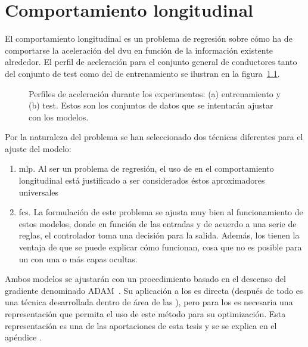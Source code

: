 \chapter{Comportamiento longitudinal}
\label{ch:longitudinal-model}

El comportamiento longitudinal es un problema de regresión sobre cómo ha de comportarse la aceleración del \ac{dvu} en función de la información existente alrededor. El perfil de aceleración para el conjunto general de conductores tanto del conjunto de test como del de entrenamiento se ilustran en la figura~\ref{fig:acceleration-profiles}.

\begin{figure}[!b]
	\centering
	\qquad
	\caption[Perfiles de aceleración a ajustar por los modelos. Conjuntos de entrenamiento y de test]{Perfiles de aceleración durante los experimentos: (a) entrenamiento y (b) test. Estos son los conjuntos de datos que se intentarán ajustar con los modelos.}
	\label{fig:acceleration-profiles}
\end{figure}

Por la naturaleza del problema se han seleccionado dos técnicas diferentes para el ajuste del modelo:

\begin{enumerate}
	\item \ac{mlp}. Al ser un problema de regresión, el uso de  en el comportamiento longitudinal está justificado a ser considerados éstos aproximadores universales~\cite{hornik1991approximation}
	\item \ac{fcs}. La formulación de este problema se ajusta muy bien al funcionamiento de estos modelos, donde en función de las entradas y de acuerdo a una serie de reglas, el controlador toma una decisión para la salida. Además, los  tienen la ventaja de que se puede explicar cómo funcionan, cosa que no es posible para un  con una o más capas ocultas.
\end{enumerate}

Ambos modelos se ajustarán con un procedimiento basado en el descenso del gradiente denominado ADAM~\cite{kingma2014adam}. Su aplicación a los  es directa (después de todo es una técnica desarrollada dentro de área de las ), pero para los  es necesaria una representación que permita el uso de este método para su optimización. Esta representación es una de las aportaciones de esta tesis y se se explica en el apéndice .

